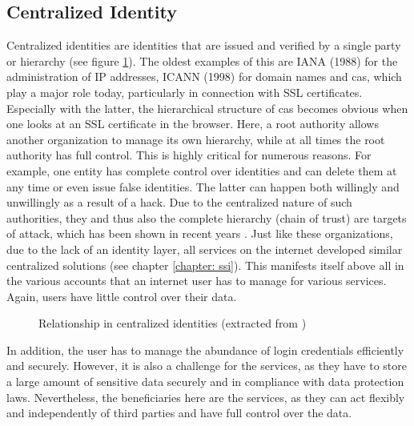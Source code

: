 	    \subsection{Centralized Identity}
	    Centralized identities are identities that are issued and verified by a single party or hierarchy (see figure \ref{figure: centralized}). The oldest examples of this are IANA (1988) for the administration of IP addresses, ICANN (1998) for domain names and \acfp{ca}, which play a major role today, particularly in connection with SSL certificates. Especially with the latter, the hierarchical structure of \acp{ca} becomes obvious when one looks at an SSL certificate in the browser. Here, a root authority allows another organization to manage its own hierarchy, while at all times the root authority has full control. This is highly critical for numerous reasons. For example, one entity has complete control over identities and can delete them at any time or even issue false identities. The latter can happen both willingly and unwillingly as a result of a hack. Due to the centralized nature of such authorities, they and thus also the complete hierarchy (chain of trust) are targets of attack, which has been shown in recent years \cite{borchers_diginotar-ssl-gau_2012}. Just like these organizations, due to the lack of an identity layer, all services on the internet developed similar centralized solutions (see chapter \ref{chapter: ssi}). This manifests itself above all in the various accounts that an internet user has to manage for various services. Again, users have little control over their data. \cite{allen_path_2016}
	    
	    \begin{figure}[ht]
    	    \centering
    	    \makebox[\textwidth]{}
            \caption[Relationship in centralized identities]{Relationship in centralized identities (extracted from \cite[p. 7]{preukschat_self-sovereign_2021})}
            \label{figure: centralized}
        \end{figure}
	    
	    In addition, the user has to manage the abundance of login credentials efficiently and securely. However, it is also a challenge for the services, as they have to store a large amount of sensitive data securely and in compliance with data protection laws. Nevertheless, the beneficiaries here are the services, as they can act flexibly and independently of third parties and have full control over the data. \cite[p. 6]{ehrlich_self-sovereign_2021}
	    
